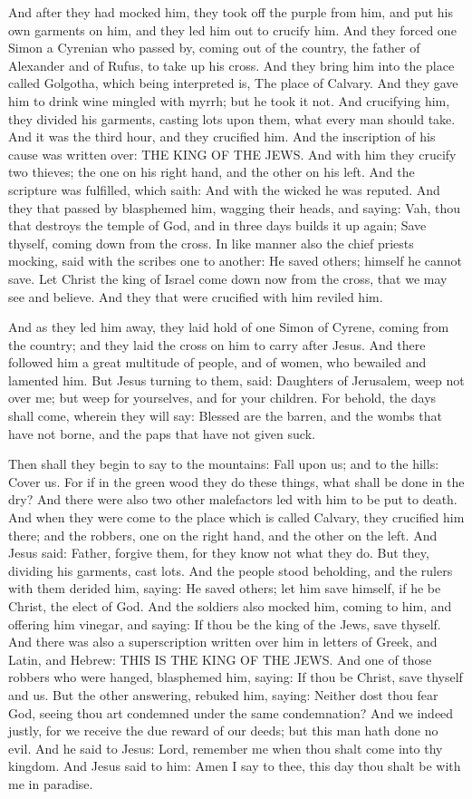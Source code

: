 And after they had mocked him, they took off the purple from him, and put his own garments on him, and they led him out
to crucify him. And they forced one Simon a Cyrenian who passed by, coming out of the country, the father of Alexander
and of Rufus, to take up his cross. And they bring him into the place called Golgotha, which being interpreted is, The
place of Calvary. And they gave him to drink wine mingled with myrrh; but he took it not. And crucifying him, they
divided his garments, casting lots upon them, what every man should take. And it was the third hour, and they crucified
him. And the inscription of his cause was written over: THE KING OF THE JEWS. And with him they crucify two thieves;
the one on his right hand, and the other on his left. And the scripture was fulfilled, which saith: And with the wicked
he was reputed. And they that passed by blasphemed him, wagging their heads, and saying: Vah, thou that destroys the
temple of God, and in three days builds it up again; Save thyself, coming down from the cross. In like manner also the
chief priests mocking, said with the scribes one to another: He saved others; himself he cannot save. Let Christ the
king of Israel come down now from the cross, that we may see and believe. And they that were crucified with him reviled
him.

And as they led him away, they laid hold of one Simon of Cyrene, coming from the country; and they laid the cross on him
to carry after Jesus. And there followed him a great multitude of people, and of women, who bewailed and lamented him.
But Jesus turning to them, said: Daughters of Jerusalem, weep not over me; but weep for yourselves, and for your
children. For behold, the days shall come, wherein they will say: Blessed are the barren, and the wombs that have not
borne, and the paps that have not given suck.

Then shall they begin to say to the mountains: Fall upon us; and to the hills: Cover us. For if in the green wood they
do these things, what shall be done in the dry? And there were also two other malefactors led with him to be put to
death. And when they were come to the place which is called Calvary, they crucified him there; and the robbers, one on
the right hand, and the other on the left. And Jesus said: Father, forgive them, for they know not what they do. But
they, dividing his garments, cast lots. And the people stood beholding, and the rulers with them derided him, saying:
He saved others; let him save himself, if he be Christ, the elect of God. And the soldiers also mocked him, coming to
him, and offering him vinegar, and saying: If thou be the king of the Jews, save thyself. And there was also a
superscription written over him in letters of Greek, and Latin, and Hebrew: THIS IS THE KING OF THE JEWS. And one of
those robbers who were hanged, blasphemed him, saying: If thou be Christ, save thyself and us. But the other answering,
rebuked him, saying: Neither dost thou fear God, seeing thou art condemned under the same condemnation? And we indeed
justly, for we receive the due reward of our deeds; but this man hath done no evil. And he said to Jesus: Lord,
remember me when thou shalt come into thy kingdom. And Jesus said to him: Amen I say to thee, this day thou shalt be
with me in paradise.

